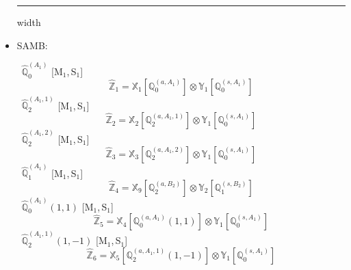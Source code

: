 \documentclass[fleqn,10pt,landscape]{article}
\begin{document}
\begin{itemize}
 \hfil \hrule height 1mm width \textwidth \hfil

\item SAMB:

\vspace{4mm}
\noindent {} $\,\,\,\hat{\mathbb{Q}}_{0}^{(A_{1})}$ [M$_{1}$,\,S$_{1}$]
\begin{dmath*}
\hat{\mathbb{Z}}_{1}=\mathbb{X}_{1}[\mathbb{Q}_{0}^{(a,A_{1})}] \otimes\mathbb{Y}_{1}[\mathbb{Q}_{0}^{(s,A_{1})}]
\end{dmath*}
\vspace{4mm}
\noindent {} $\,\,\,\hat{\mathbb{Q}}_{2}^{(A_{1},1)}$ [M$_{1}$,\,S$_{1}$]
\begin{dmath*}
\hat{\mathbb{Z}}_{2}=\mathbb{X}_{2}[\mathbb{Q}_{2}^{(a,A_{1},1)}] \otimes\mathbb{Y}_{1}[\mathbb{Q}_{0}^{(s,A_{1})}]
\end{dmath*}
\vspace{4mm}
\noindent {} $\,\,\,\hat{\mathbb{Q}}_{2}^{(A_{1},2)}$ [M$_{1}$,\,S$_{1}$]
\begin{dmath*}
\hat{\mathbb{Z}}_{3}=\mathbb{X}_{3}[\mathbb{Q}_{2}^{(a,A_{1},2)}] \otimes\mathbb{Y}_{1}[\mathbb{Q}_{0}^{(s,A_{1})}]
\end{dmath*}
\vspace{4mm}
\noindent {} $\,\,\,\hat{\mathbb{Q}}_{1}^{(A_{1})}$ [M$_{1}$,\,S$_{1}$]
\begin{dmath*}
\hat{\mathbb{Z}}_{4}=\mathbb{X}_{9}[\mathbb{Q}_{2}^{(a,B_{2})}] \otimes\mathbb{Y}_{2}[\mathbb{Q}_{1}^{(s,B_{2})}]
\end{dmath*}
\vspace{4mm}
\noindent {} $\,\,\,\hat{\mathbb{Q}}_{0}^{(A_{1})}(1,1)$ [M$_{1}$,\,S$_{1}$]
\begin{dmath*}
\hat{\mathbb{Z}}_{5}=\mathbb{X}_{4}[\mathbb{Q}_{0}^{(a,A_{1})}(1,1)] \otimes\mathbb{Y}_{1}[\mathbb{Q}_{0}^{(s,A_{1})}]
\end{dmath*}
\vspace{4mm}
\noindent {} $\,\,\,\hat{\mathbb{Q}}_{2}^{(A_{1},1)}(1,-1)$ [M$_{1}$,\,S$_{1}$]
\begin{dmath*}
\hat{\mathbb{Z}}_{6}=\mathbb{X}_{5}[\mathbb{Q}_{2}^{(a,A_{1},1)}(1,-1)] \otimes\mathbb{Y}_{1}[\mathbb{Q}_{0}^{(s,A_{1})}]
\end{dmath*}

\end{itemize}
\end{document}
